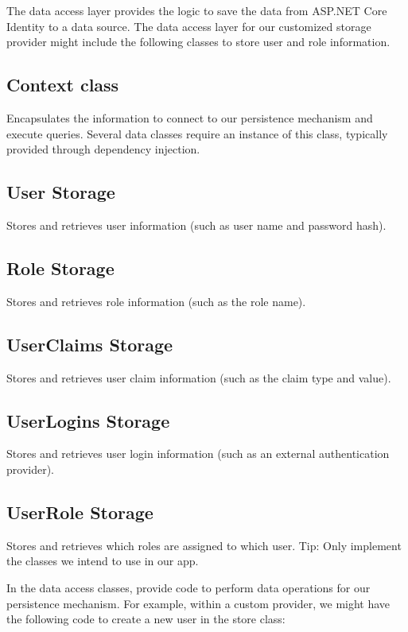 \documentclass{report}
\begin{document}
    The data access layer provides the logic to save the data from ASP.NET Core
    Identity to a data source. The data access layer for our customized storage
    provider might include the following classes to store user and role information.

    \subsection{Context class}
    Encapsulates the information to connect to our persistence mechanism and
    execute queries. Several data classes require an instance of this class, typically
    provided through dependency injection.

    \subsection{User Storage}
    Stores and retrieves user information (such as user name and password hash).

    \subsection{Role Storage}
    Stores and retrieves role information (such as the role name).

    \subsection{UserClaims Storage}
    Stores and retrieves user claim information (such as the claim type and value).

    \subsection{UserLogins Storage}
    Stores and retrieves user login information (such as an external authentication
    provider).

    \subsection{UserRole Storage}
    Stores and retrieves which roles are assigned to which user.
    Tip: Only implement the classes we intend to use in our app.

    In the data access classes, provide code to perform data operations for our
    persistence mechanism. For example, within a custom provider, we might have
    the following code to create a new user in the store class:
    
\end{document}
